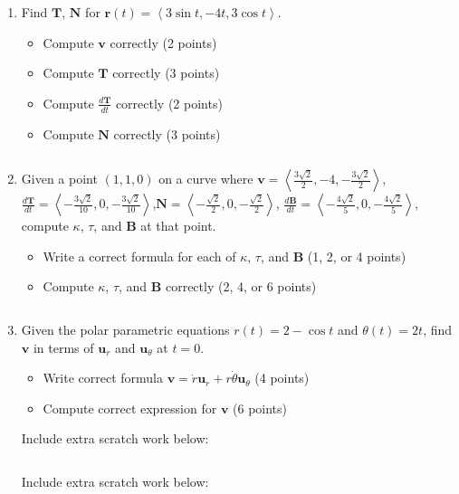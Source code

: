 \documentclass[12pt]{article}
\newcommand{\up}{$~$\vspace*{-0.7in}}
\newcommand{\liner}{\noindent\underline{\hspace*{7in}}}
\renewcommand{\vec}{\mathbf}
\newcommand{\<}{\left<}
\renewcommand{\>}{\right>}
\begin{document}
\begin{enumerate}



\item Find $\vec{T}$, $\vec{N}$ for $\vec{r}(t) = \left< 3\sin t, -4t, 3\cos t \right>$.

  \begin{itemize}
    \item Compute $\vec{v}$ correctly (2 points)
    \item Compute $\vec{T}$ correctly (3 points)
    \item Compute $\frac{d\vec{T}}{dt}$ correctly (2 points)
    \item Compute $\vec{N}$ correctly (3 points)
  \end{itemize}

\vspace*{8in}

\liner
\newpage\up


\item Given a point $(1,1,0)$ on a curve where $\vec{v}=\left< \frac{3\sqrt{2}}{2}, -4, -\frac{3\sqrt{2}}{2}\right>$, $\frac{d\vec{T}}{dt}=\left<-\frac{3\sqrt{2}}{10},0,-\frac{3\sqrt{2}}{10}\right>$,\newline $\vec{N}=\left<-\frac{\sqrt{2}}{2},0,-\frac{\sqrt{2}}{2}\right>$, $\frac{d\vec{B}}{dt}=\left<-\frac{4\sqrt{2}}{5},0,-\frac{4\sqrt{2}}{5}\right>$, compute $\kappa$, $\tau$, and $\vec{B}$ at that point.

  \begin{itemize}
    \item Write a correct formula for each of $\kappa$, $\tau$, and $\vec{B}$ (1, 2, or 4 points)
    \item Compute $\kappa$, $\tau$, and $\vec{B}$ correctly (2, 4, or 6 points)
  \end{itemize}

\vspace*{8in}

\liner

\newpage\up

\item Given the polar parametric equations $r(t)=2-\cos t$ and $\theta(t)=2t$, find $\vec{v}$ in terms of $\vec{u}_r$ and $\vec{u}_\theta$ at $t=0$.

  \begin{itemize}
    \item Write correct formula $\vec{v} = \dot{r}\vec{u}_r + r\dot\theta\vec{u}_\theta$ (4 points)
    \item Compute correct expression for $\vec{v}$ (6 points)
  \end{itemize}

\vspace*{8in}

\liner
\newpage

\centerline{Include extra scratch work below:}
\liner
\newpage\up

\centerline{Include extra scratch work below:}
\liner

\end{enumerate}
\end{document}
